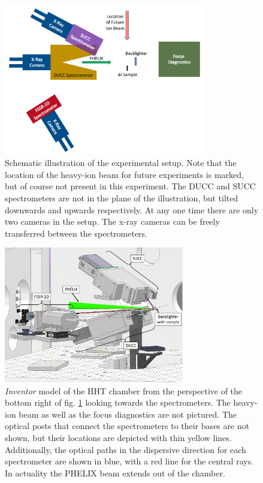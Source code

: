 \begin{figure}[H]
	\centering
	\includegraphics[width = 0.79\textwidth]{Diagrams/Experimental_setup_schematic.pdf}
	\caption{Schematic illustration of the experimental setup. Note that the 
	location of the heavy-ion beam for future experiments is marked, but of 
	course not present in this experiment. The DUCC and SUCC spectrometers are 
	not in the plane of the illustration, but tilted downwards and upwards 
	respectively. At any one time there are only two cameras in the setup. The x-ray cameras can be freely transferred between the 
	spectrometers.}
	\label{fig: setup schematic}
\end{figure}

\begin{figure}[H]
	\centering
	\includegraphics[width = 0.7\textwidth]{Diagrams/Inv_HHT_labeled.PNG}
	\caption{\textit{Inventor} model of the HHT chamber from the perspective of 
	the 
	bottom right of fig. \ref{fig: setup schematic} looking towards the 
	spectrometers. The heavy-ion beam as well as the focus diagnostics are not 
	pictured. The optical posts that connect the spectrometers to their bases 
	are not shown, but their locations are depicted with thin yellow lines. 
	Additionally, the optical paths in the dispersive direction for each 
	spectrometer are shown in blue, with a red line for the central rays. In 
	actuality the PHELIX beam extends out of the chamber.}
	\label{fig: setup inventor}
\end{figure}

